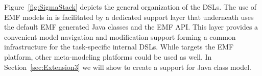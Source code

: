 Figure~\ref{fig:SigmaStack} depicts the general organization of the \SIGMA DSLs.
The use of EMF models in \SIGMA is facilitated by a dedicated support layer that underneath uses the default EMF generated Java classes and the EMF API.
This layer provides a convenient model navigation and modification support forming a common infrastructure for the task-specific internal DSLs.
While \SIGMA targets the EMF platform, other meta-modeling platforms could be used as well.
In Section~\ref{sec:Extension3} we will show to create a support for Java class model.